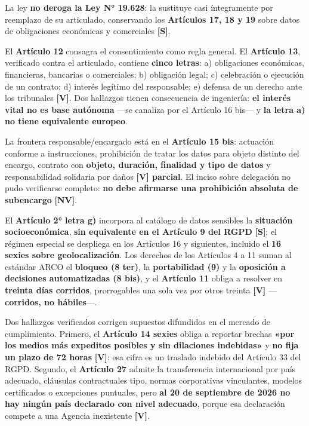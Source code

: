 La ley \textbf{no deroga la Ley N° 19.628}: la sustituye casi íntegramente por reemplazo de su articulado, conservando los \textbf{Artículos 17, 18 y 19} sobre datos de obligaciones económicas y comerciales \textbf{{[}S{]}}.

El \textbf{Artículo 12} consagra el consentimiento como regla general. El \textbf{Artículo 13}, verificado contra el articulado, contiene \textbf{cinco letras}: a) obligaciones económicas, financieras, bancarias o comerciales; b) obligación legal; c) celebración o ejecución de un contrato; d) interés legítimo del responsable; e) defensa de un derecho ante los tribunales \textbf{{[}V{]}}. Dos hallazgos tienen consecuencia de ingeniería: \textbf{el interés vital no es base autónoma} ---se canaliza por el Artículo 16 bis--- y \textbf{la letra a) no tiene equivalente europeo}.

La frontera responsable/encargado está en el \textbf{Artículo 15 bis}: actuación conforme a instrucciones, prohibición de tratar los datos para objeto distinto del encargo, contrato con \textbf{objeto, duración, finalidad y tipo de datos} y responsabilidad solidaria por daños \textbf{{[}V{]} parcial}. El inciso sobre delegación no pudo verificarse completo: \textbf{no debe afirmarse una prohibición absoluta de subencargo} \textbf{{[}NV{]}}.

El \textbf{Artículo 2° letra g)} incorpora al catálogo de datos sensibles la \textbf{situación socioeconómica}, \textbf{sin equivalente en el Artículo 9 del RGPD} \textbf{{[}S{]}}; el régimen especial se despliega en los Artículos 16 y siguientes, incluido el \textbf{16 sexies sobre geolocalización}. Los derechos de los Artículos 4 a 11 suman al estándar ARCO el \textbf{bloqueo (8 ter)}, la \textbf{portabilidad (9)} y la \textbf{oposición a decisiones automatizadas (8 bis)}, y el \textbf{Artículo 11} obliga a resolver en \textbf{treinta días corridos}, prorrogables una sola vez por otros treinta \textbf{{[}V{]}} ---\textbf{corridos, no hábiles}---.

Dos hallazgos verificados corrigen supuestos difundidos en el mercado de cumplimiento. Primero, el \textbf{Artículo 14 sexies} obliga a reportar brechas \textbf{«por los medios más expeditos posibles y sin dilaciones indebidas»} y \textbf{no fija un plazo de 72 horas} \textbf{{[}V{]}}: esa cifra es un traslado indebido del Artículo 33 del RGPD. Segundo, el \textbf{Artículo 27} admite la transferencia internacional por país adecuado, cláusulas contractuales tipo, normas corporativas vinculantes, modelos certificados o excepciones puntuales, pero \textbf{al 20 de septiembre de 2026 no hay ningún país declarado con nivel adecuado}, porque esa declaración compete a una Agencia inexistente \textbf{{[}V{]}}.

